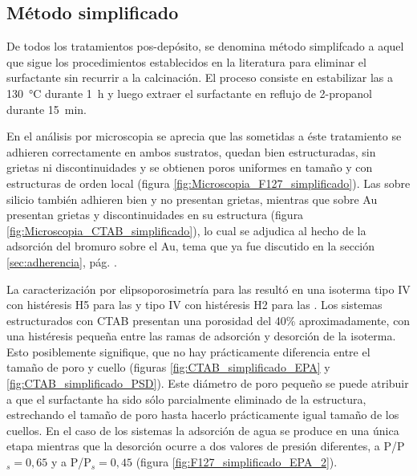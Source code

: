 	 \subsection{Método simplificado}

		 	De todos los tratamientos pos-depósito, se denomina método simplifcado a aquel que sigue los procedimientos establecidos en la literatura para eliminar el surfactante sin recurrir a la calcinación.\cite{Angelome2008,Calvo20210,Calvo2010,Fuertes2009} El proceso consiste en estabilizar las \pdm\space a \SI{130}{\celsius} durante \SI{1}{\hour} y luego extraer el surfactante en reflujo de 2-propanol durante \SI{15}{\minute}. 
			
			En el análisis por microscopia se aprecia que las \pdmF\space sometidas a éste tratamiento se adhieren correctamente en ambos sustratos, quedan bien estructuradas, sin grietas ni discontinuidades y se obtienen poros uniformes en tamaño y con estructuras de orden local (figura \ref{fig:Microscopia_F127_simplificado}). Las \pdmC\space sobre silicio también adhieren bien y no presentan grietas, mientras que sobre Au presentan grietas y discontinuidades en su estructura (figura \ref{fig:Microscopia_CTAB_simplificado}), lo cual se adjudica al hecho de la adsorción del bromuro sobre el Au, tema que ya fue discutido en la sección \ref{sec:adherencia}, pág. \pageref{sec:adherencia}. 
			
			La caracterización por elipsoporosimetría para las \pdmF\space resultó en una isoterma tipo IV con histéresis H5 para las \pdmC\space y tipo IV con histéresis H2 para las \pdmF\cite{Thommes2015}. Los sistemas estructurados con CTAB presentan una porosidad del 40\% aproximadamente, con una histéresis pequeña entre las ramas de adsorción y desorción de la isoterma. Esto posiblemente signifique, que no hay prácticamente diferencia entre el tamaño de poro y cuello (figuras \ref{fig:CTAB_simplificado_EPA}  y \ref{fig:CTAB_simplificado_PSD}). Este diámetro de poro pequeño se puede atribuir a que el surfactante ha sido sólo parcialmente eliminado de la estructura, estrechando el tamaño de poro hasta hacerlo prácticamente igual tamaño de los cuellos.
			En el caso de los sistemas \pdmF\space la adsorción de agua se produce en una única etapa mientras que la desorción ocurre a dos valores de presión diferentes, a P/P$_s=0,65$ y a P/P$_s=0,45$ (figura \ref{fig:F127_simplificado_EPA_2}). 


